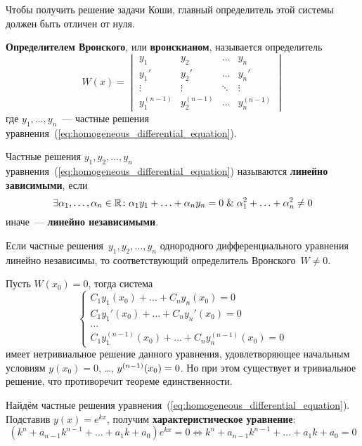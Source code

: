 Чтобы получить решение задачи Коши, главный определитель этой системы должен быть отличен от нуля.

  \textbf{Определителем Вронского}, или \textbf{вронскианом}, называется определитель
\begin{equation*}
W(x) =
\begin{vmatrix}
y_1 & y_2 & \ldots & y_n \\
y_1' & y_2' & \ldots & y_n' \\
\vdots & \vdots & \ddots & \vdots \\
y_1^{(n-1)} & y_2^{(n-1)} & \ldots & y_n^{(n-1)}
\end{vmatrix}
\end{equation*}
где $y_1, \ldots, y_n$~--- частные решения уравнения~(\ref*{eq:homogeneous_differential_equation}).

Частные решения $y_1, y_2, \ldots, y_n$ уравнения~(\ref*{eq:homogeneous_differential_equation}) называются \textbf{линейно зависимыми}, если
\begin{equation*}
\exists \alpha_1, \ldots, \alpha_n \in \mathbb R \colon
\alpha_1 y_1 + \ldots + \alpha_n y_n = 0 \mathrel{\&}
\alpha_1^2 + \ldots + \alpha_n^2 \neq 0
\end{equation*}
иначе~--- \textbf{линейно независимыми}.

\begin{statement}
Если частные решения~$y_1, y_2, \ldots, y_n$ однородного дифференциального уравнения линейно независимы, то соответствующий определитель Вронского~$W \neq 0$.
\end{statement}
\begin{proofcontra}
Пусть $W(x_0) = 0$, тогда система
\begin{equation*}
\begin{cases}
C_1 y_1(x_0) + \ldots + C_n y_n(x_0) = 0 \\
C_1 y_1'(x_0) + \ldots + C_n y_n'(x_0) = 0 \\
\ldots \\
C_1 y_1^{(n-1)}(x_0) + \ldots + C_n y_n^{(n-1)}(x_0) = 0
\end{cases}
\end{equation*}
имеет нетривиальное решение данного уравнения, удовлетворяющее начальным условиям $y(x_0) = 0$, \ldots, $y^{(n-1)}(x_0) \opbr= 0$.
Но при этом существует и тривиальное решение, что противоречит теореме единственности.
\end{proofcontra}

 Найдём частные решения уравнения~(\ref*{eq:homogeneous_differential_equation}).
Подставив $y(x) = e^{kx}$, получим \textbf{характеристическое уравнение}:
\begin{equation*}
(k^n + a_{n-1} k^{n-1} + \ldots + a_1 k + a_0) e^{kx} = 0 \Leftrightarrow
k^n + a_{n-1} k^{n-1} + \ldots + a_1 k + a_0 = 0
\end{equation*}

